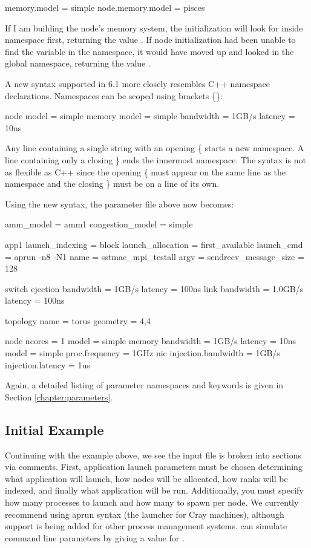 \begin{ViFile}
memory.model = simple
node.memory.model = pisces
\end{ViFile}
If I am building the node's memory system, the initialization will look for  inside namespace  first, returning the value .
If node initialization had been unable to find the variable in the  namespace,
it would have moved up and looked in the global namespace, returning the value .

A new syntax supported in 6.1 more closely resembles C++ namespace declarations. 
Namespaces can be scoped using brackets \{\}:

\begin{ViFile}
node {
 model = simple
 memory {
   model = simple
   bandwidth = 1GB/s
   latency = 10ns
 }
}
\end{ViFile}
Any line containing a single string with an opening \{ starts a new namespace.
A line containing only a closing \} ends the innermost namespace.
The syntax is not as flexible as C++ since the opening \{ must appear on the same line as the namespace and the closing \} must be on a line of its own.

Using the new syntax, the parameter file above now becomes:

\begin{ViFile}
amm_model = amm1
congestion_model = simple

app1 {
 launch_indexing = block
 launch_allocation = first_available
 launch_cmd = aprun -n8 -N1
 name = sstmac_mpi_testall
 argv =
 sendrecv_message_size = 128
}

switch {
 ejection {
  bandwidth = 1GB/s
  latency = 100ns
 }
 link {
  bandwidth = 1.0GB/s
  latency = 100ns
 }
}

topology {
 name = torus
 geometry = 4,4
}

node {
 ncores = 1
 model = simple
 memory {
  bandwidth = 1GB/s
  latency = 10ns
  model = simple
 }
 proc.frequency = 1GHz
 nic {
  injection.bandwidth = 1GB/s
  injection.latency = 1us
 }
}
\end{ViFile}
Again, a detailed listing of parameter namespaces and keywords is given in Section \ref{chapter:parameters}.

\subsection{Initial Example}
Continuing with the example above, we see the input file is broken into sections via comments.  
First, application launch parameters must be chosen determining what application will launch, 
how nodes will be allocated, how ranks will be indexed, and finally what application will be run.  
Additionally, you must specify how many processes to launch and how many to spawn per node.  
We currently recommend using aprun syntax (the launcher for Cray machines), 
although support is being added for other process management systems.
\sstmacro can simulate command line parameters by giving a value for .

